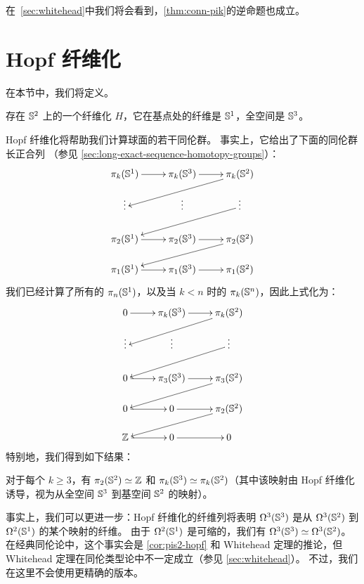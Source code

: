 在~\cref{sec:whitehead}中我们将会看到，\cref{thm:conn-pik}的逆命题也成立。

%
%

\section{Hopf 纤维化}
\label{sec:hopf}

在本节中，我们将定义。
%

\begin{thm}\label{thm:hopf-fibration}
  存在 $\mathbb{S} ^2$ 上的一个纤维化 $H$，它在基点处的纤维是 $\mathbb{S} ^1$，全空间是 $\mathbb{S} ^3$。
\end{thm}

Hopf 纤维化将帮助我们计算球面的若干同伦群。
事实上，它给出了下面的同伦群长正合列
（参见
\cref{sec:long-exact-sequence-homotopy-groups}）：
%
\[
\xymatrix@R=1.2pc{
  \pi_k(\Sn^1) \ar[r] & \pi_k(\Sn^3) \ar[r] & \pi_k(\Sn^2) \ar[lld] \\
  \vdots & \vdots & \vdots \ar[lld] \\
  \pi_2(\Sn^1) \ar[r] & \pi_2(\Sn^3) \ar[r] & \pi_2(\Sn^2) \ar[lld] \\
  \pi_1(\Sn^1) \ar[r] & \pi_1(\Sn^3) \ar[r] & \pi_1(\Sn^2)}
\]
%
我们已经计算了所有的 $\pi_n(\mathbb{S}^1)$，以及当 $k<n$ 时的 $\pi_k(\mathbb{S}^n)$，因此上式化为：
%
\[
\xymatrix@R=1.2pc{
  0 \ar[r] & \pi_k(\Sn^3) \ar[r] & \pi_k(\Sn^2) \ar[lld] \\
  \vdots & \vdots & \vdots \ar[lld] \\
  0 \ar[r] & \pi_3(\Sn^3) \ar[r] & \pi_3(\Sn^2) \ar[lld] \\
  0 \ar[r] & 0 \ar[r] & \pi_2(\Sn^2) \ar[lld] \\
  \Z \ar[r] & 0 \ar[r] & 0}
\]
%
特别地，我们得到如下结果：

\begin{cor} \label{cor:pis2-hopf}
  对于每个 $k\ge3$，有 $\pi_2(\mathbb{S}^2) \simeq \mathbb{Z}$ 和 $\pi_k(\mathbb{S}^3) \simeq \pi_k(\mathbb{S}^2)$（其中该映射由 Hopf 纤维化诱导，视为从全空间 $\mathbb{S}^3$ 到基空间 $\mathbb{S}^2$ 的映射）。
\end{cor}

事实上，我们可以更进一步：Hopf 纤维化的纤维列将表明 $\Omega^3(\mathbb{S}^3)$ 是从 $\Omega^3(\mathbb{S}^2)$ 到 $\Omega^2(\mathbb{S}^1)$ 的某个映射的纤维。
由于 $\Omega^2(\mathbb{S}^1)$ 是可缩的，我们有 $\Omega^3(\mathbb{S}^3) \simeq \Omega^3(\mathbb{S}^2)$。
在经典同伦论中，这个事实会是 \cref{cor:pis2-hopf} 和 Whitehead 定理的推论，但 Whitehead 定理在同伦类型论中不一定成立（参见 \cref{sec:whitehead}）。
不过，我们在这里不会使用更精确的版本。

